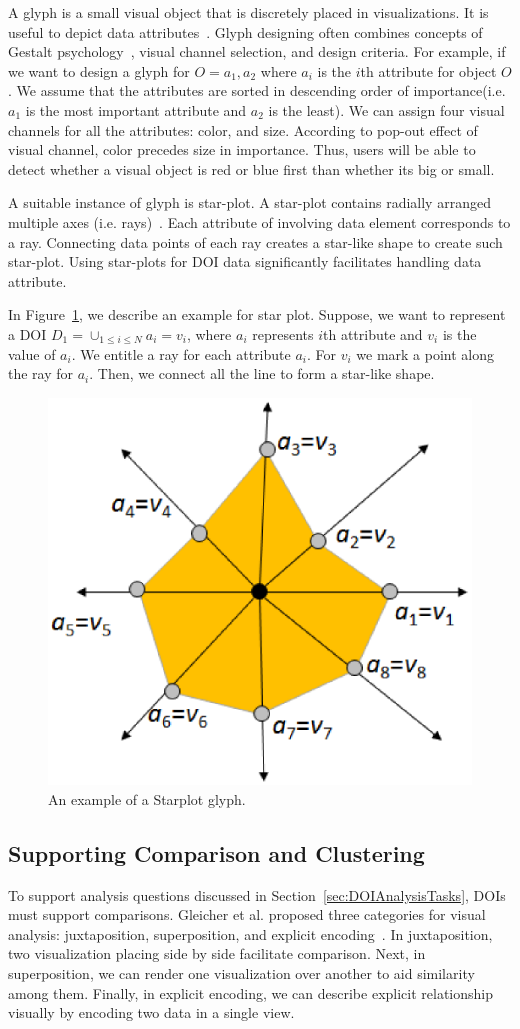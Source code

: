 A glyph is a small visual object that is discretely placed in visualizations. It is useful to depict data attributes~\cite{borgo2013glyph}. Glyph designing often combines concepts of Gestalt psychology~\cite{kohler1970gestalt}, visual channel selection, and design criteria. For example, if we want to design a glyph for $O = {a_1, a_2}$ where $a_i$ is the $i$th attribute for object $O$. We assume that the attributes are sorted in descending order of importance(i.e. $a_1$ is the most important attribute and $a_2$ is the least). We can assign four visual channels for all the attributes: color, and size. According to pop-out effect of visual channel, color precedes size in importance. Thus, users will be able to detect whether a visual object is red or blue first than whether its big or small. 

A suitable instance of glyph is star-plot. A star-plot contains radially arranged multiple axes (i.e. rays)~\cite{klippel2009star}. Each attribute of involving data element corresponds to a ray. Connecting data points of each ray creates a star-like shape to create such star-plot. Using star-plots for DOI data significantly facilitates handling data attribute. 

In Figure~\ref{fig:StarplotExample}, we describe an example for star plot. Suppose, we want to represent a DOI $D_1=\cup_{1 \leq i \leq N}a_i=v_i $, where $a_i$ represents $i$th attribute and $v_i$ is the value of $a_i$. We entitle a ray for each attribute $a_i$. For $v_i$ we mark a point along the ray for $a_i$. Then, we connect all the line to form a star-like shape.  
\begin{figure}[htbp]
  \centering
  \includegraphics[width=0.5\linewidth]{images/StarplotExample.eps}
  \caption{An example of a Starplot glyph. }
	\label{fig:StarplotExample}
\end{figure}

\subsection{Supporting Comparison and Clustering}
\label{sec:ComparisonSupport}
To support analysis questions discussed in Section~\ref{sec:DOIAnalysisTasks}, DOIs must support comparisons. Gleicher et al. proposed three categories for visual analysis: juxtaposition, superposition, and explicit encoding~\cite{Glei11}. In juxtaposition, two visualization placing side by side facilitate comparison. Next, in superposition, we can render one visualization over another to aid similarity among them. Finally, in explicit encoding, we can describe explicit relationship visually by encoding two data in a single view.

